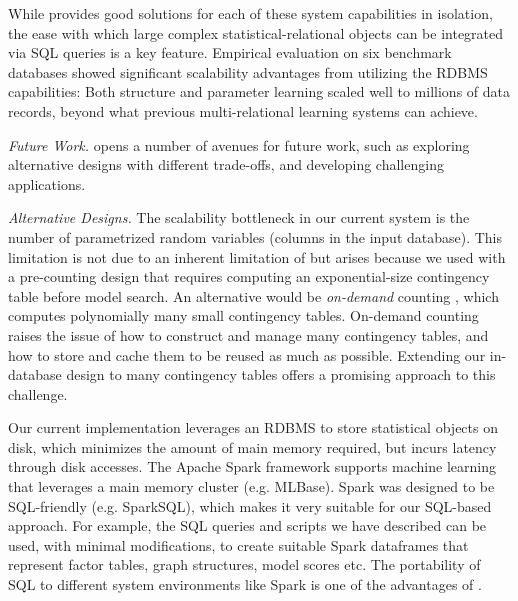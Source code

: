 While \FB  provides good solutions for each of these system capabilities in isolation, the ease with which large complex statistical-relational objects can be integrated via SQL queries is a key feature. 
Empirical evaluation on six benchmark databases showed significant scalability advantages from utilizing the RDBMS capabilities: Both structure and parameter learning scaled well to millions of data records, beyond what previous multi-relational learning systems can achieve. 

{\em Future Work.} \FB opens a number of avenues for future work, such as exploring alternative designs with different trade-offs, and developing challenging applications. 

{\em Alternative Designs.} The scalability bottleneck in our current system is the number of parametrized random variables (columns in the input database). This limitation is not due to an inherent limitation of \FB but arises because we used \FB with a pre-counting design that requires computing an exponential-size contingency table before model search. An alternative would be {\em on-demand} counting \cite{Lv2012}, which computes polynomially many small contingency tables. On-demand counting raises the issue of how to construct and manage many contingency tables, and how to store and cache them to be reused as much as possible. Extending our in-database design to many contingency tables offers a promising approach to this challenge.

Our current implementation leverages an RDBMS to store statistical objects on disk, which minimizes the amount of main memory required, but incurs latency through disk accesses. 
The Apache Spark \cite{Committers} framework supports machine learning that leverages a  main memory cluster (e.g. MLBase). Spark was designed to be SQL-friendly (e.g. SparkSQL), which makes it very suitable for our SQL-based approach. For example, the SQL queries and scripts we have described can be used, with minimal  modifications, to create suitable Spark dataframes that represent factor tables, graph structures, model scores etc. The portability of SQL to different system environments like Spark is one of the advantages of \FB.

